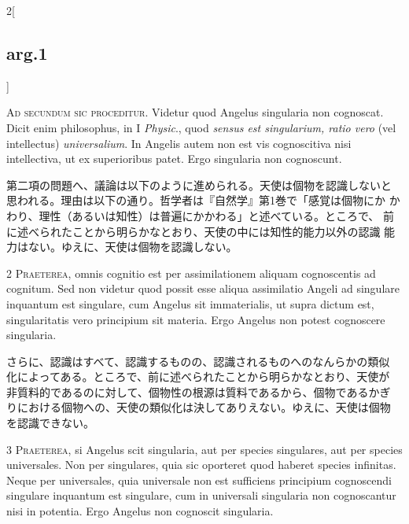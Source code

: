 \documentclass[paper=a4paper,fontsize=10pt,jafontsize=9pt,titlepage]{jlreq}
\begin{document}
\begin{paracol}{2}[\subsection{arg.1}]

{\huge A}{\scshape d secundum sic proceditur}. Videtur quod Angelus
singularia non cognoscat. Dicit enim philosophus, in I {\itshape
Physic}., quod {\itshape sensus est singularium, ratio vero} (vel
intellectus) {\itshape universalium}. In Angelis autem non est vis
cognoscitiva nisi intellectiva, ut ex superioribus patet. Ergo
singularia non cognoscunt.

\switchcolumn

第二項の問題へ、議論は以下のように進められる。天使は個物を認識しないと
思われる。理由は以下の通り。哲学者は『自然学』第1巻で「感覚は個物にか
かわり、理性（あるいは知性）は普遍にかかわる」と述べている。ところで、
前に述べられたことから明らかなとおり、天使の中には知性的能力以外の認識
能力はない。ゆえに、天使は個物を認識しない。


{\scshape 2 Praeterea}, omnis cognitio est per assimilationem aliquam
cognoscentis ad cognitum. Sed non videtur quod possit esse aliqua
assimilatio Angeli ad singulare inquantum est singulare, cum Angelus
sit immaterialis, ut supra dictum est, singularitatis vero principium
sit materia. Ergo Angelus non potest cognoscere singularia.

\switchcolumn

さらに、認識はすべて、認識するものの、認識されるものへのなんらかの類似
化によってある。ところで、前に述べられたことから明らかなとおり、天使が
非質料的であるのに対して、個物性の根源は質料であるから、個物であるかぎ
りにおける個物への、天使の類似化は決してありえない。ゆえに、天使は個物
を認識できない。


{\scshape 3 Praeterea}, si Angelus scit singularia, aut per species
singulares, aut per species universales. Non per singulares, quia sic
oporteret quod haberet species infinitas. Neque per universales, quia
universale non est sufficiens principium cognoscendi singulare
inquantum est singulare, cum in universali singularia non cognoscantur
nisi in potentia. Ergo Angelus non cognoscit singularia.


\end{paracol}
\end{document}
